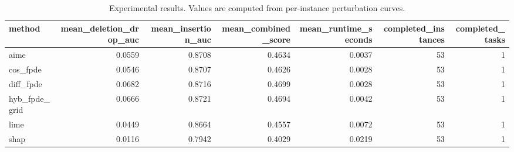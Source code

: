 \begin{table}[t]
\caption{Experimental results. Values are computed from per-instance perturbation curves.}
\label{tab:main_results_computed}
\centering
\begin{tabular}{lrrrrrr}
\toprule
method & mean\_deletion\_drop\_auc & mean\_insertion\_auc & mean\_combined\_score & mean\_runtime\_seconds & completed\_instances & completed\_tasks \\
\midrule
aime & 0.0559 & 0.8708 & 0.4634 & 0.0037 & 53 & 1 \\
cos\_fpde & 0.0546 & 0.8707 & 0.4626 & 0.0028 & 53 & 1 \\
diff\_fpde & 0.0682 & 0.8716 & 0.4699 & 0.0028 & 53 & 1 \\
hyb\_fpde\_grid & 0.0666 & 0.8721 & 0.4694 & 0.0042 & 53 & 1 \\
lime & 0.0449 & 0.8664 & 0.4557 & 0.0072 & 53 & 1 \\
shap & 0.0116 & 0.7942 & 0.4029 & 0.0219 & 53 & 1 \\
\bottomrule
\end{tabular}

\end{table}
